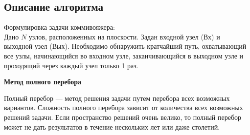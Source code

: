\documentclass[a4paper,12pt]{article}
\begin{document}
\subsection{Описание алгоритма}
Формулировка задачи коммивояжера:\\
Дано $N$ узлов, расположенных на плоскости. Задан входной узел (Вх) и выходной узел (Вых). Необходимо обнаружить кратчайший путь, охватывающий все узлы, начинающийся во входном узле, заканчивающийся в выходном узле и проходящий через каждый узел только 1 раз.\\
\begin{center}
\textbf{Метод полного перебора}
\end{center}
Полный перебор — метод решения задачи путем перебора всех возможных вариантов. Сложность полного перебора зависит от количества всех возможных решений задачи. Если пространство решений очень велико, то полный перебор может не дать результатов в течение нескольких лет или даже столетий.\\
\end{document}
